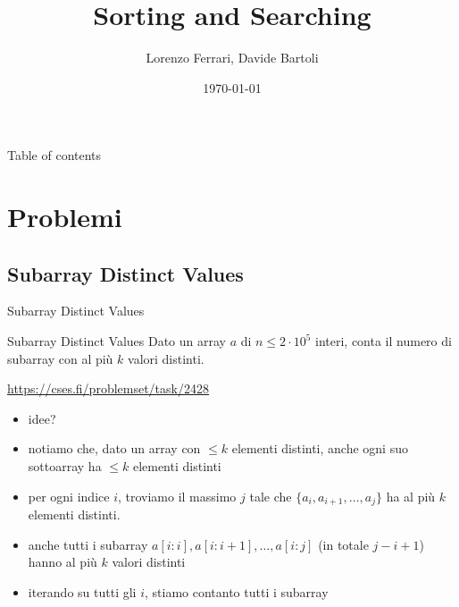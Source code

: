 \documentclass[compress]{beamer}
\title{Sorting and Searching}
\author{Lorenzo Ferrari, Davide Bartoli}
\date{\today}
\begin{document}
\begin{frame}
  \maketitle
\end{frame}

\begin{frame}{Table of contents}
  \tableofcontents
\end{frame}

\section{Problemi}

\subsection{Subarray Distinct Values}
\begin{frame}{Subarray Distinct Values}
    \begin{exampleblock}{Subarray Distinct Values}
        Dato un array $a$ di $n \leq 2 \cdot 10^5$ interi, conta il numero di subarray con al pi\`u $k$ valori distinti.
    \end{exampleblock}
    \underline{\url{https://cses.fi/problemset/task/2428}}
    \pause
    \begin{itemize}
        \item idee?
        \pause
        \item notiamo che, dato un array con $\leq k$ elementi distinti, anche ogni suo sottoarray ha $\leq k$ elementi distinti
        \pause
        \item per ogni indice $i$, troviamo il massimo $j$ tale che $\{ a_i, a_{i+1}, \dots, a_{j} \}$ ha al pi\`u $k$ elementi distinti.
        \pause
        \item anche tutti i subarray $a[i:i], a[i:i+1], \dots, a[i:j]$ (in totale $j-i+1$) hanno al pi\`u $k$ valori distinti
        \pause
        \item iterando su tutti gli $i$, stiamo contanto tutti i subarray
    \end{itemize}
\end{frame}
\end{document}
